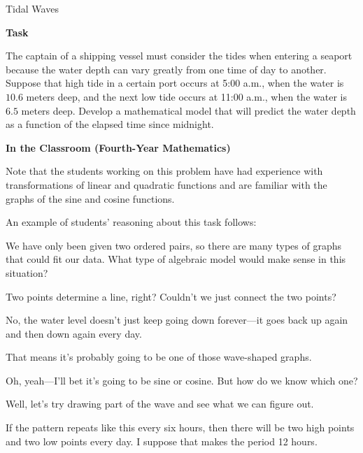 \TriExample
  {Tidal Waves}
  {
    \textbf{Task}

    The captain of a shipping vessel must consider the tides when entering a seaport because the water depth can vary greatly from one time of day to another. Suppose that high tide in a certain port occurs at 5:00 a.m., when the water is $10.6$ meters deep, and the next low tide occurs at 11:00 a.m., when the water is $6.5$ meters deep. Develop a mathematical model that will predict the water depth as a function of the elapsed time since midnight.

    \textbf{In the Classroom (Fourth-Year Mathematics)}

    Note that the students working on this problem have had experience with transformations of linear and quadratic functions and are familiar with the graphs of the sine and cosine functions.

    An example of students' reasoning about this task follows:

    \begin{scriptlist}
      \item [Teacher:] We have only been given two ordered pairs, so there are many types of graphs that could fit our data. What type of algebraic model would make sense in this situation?
      
      \item [Student 1:] Two points determine a line, right? Couldn't we just connect the two points?\vspace{\baselineskip}
      
      \item [Student 2:] No, the water level doesn't just keep going down forever---it goes back up again and then down again every day.
      
      \item [Student 3:] That means it's probably going to be one of those wave-shaped graphs.
      
      \item [Student 1:] Oh, yeah---I'll bet it's going to be sine or cosine. But how do we know which one?
      
      \item [Student 3:] Well, let's try drawing part of the wave and see what we can figure out.
      
      \item [Student 2:] If the pattern repeats like this every six hours, then there will be two high points and two low points every day. I suppose that makes the period 12 hours.


\end{scriptlist}}
